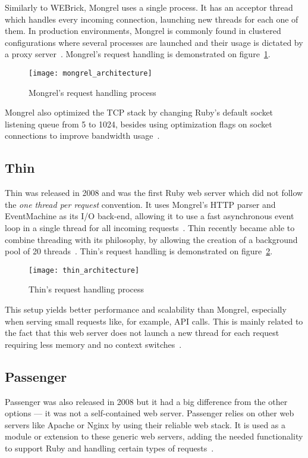 Similarly to WEBrick, Mongrel uses a single process. It has an acceptor thread which handles every incoming connection, launching new threads for each one of them. In production environments, Mongrel is commonly found in clustered configurations where several processes are launched and their usage is dictated by a proxy server~\cite{mongrel_faq}. Mongrel's request handling is demonstrated on figure~\ref{fig:mongrel_architecture}.
\begin{figure}[h]
  \centering
    \texttt{[image: mongrel\_architecture]}
  \caption{Mongrel's request handling process}
  \label{fig:mongrel_architecture}
\end{figure}
Mongrel also optimized the TCP stack by changing Ruby's default socket listening queue from 5 to 1024, besides using optimization flags on socket connections to improve bandwidth usage~\cite{mongrel_faq}.


\subsection{Thin}
Thin was released in 2008 and was the first Ruby web server which did not follow the \textit{one thread per request} convention. It uses Mongrel's HTTP parser and EventMachine as its I/O back-end, allowing it to use a fast asynchronous event loop in a single thread for all incoming requests~\cite{thin}. Thin recently became able to combine threading with its philosophy, by allowing the creation of a background pool of 20 threads~\cite{ruby_webservers}. Thin's request handling is demonstrated on figure~\ref{fig:thin_architecture}.
\begin{figure}[h]
  \centering
    \texttt{[image: thin\_architecture]}
  \caption{Thin's request handling process}
  \label{fig:thin_architecture}
\end{figure}
 This setup yields better performance and scalability than Mongrel, especially when serving small requests like, for example, API calls. This is mainly related to the fact that this web server does not launch a new thread for each request requiring less memory and no context switches~\cite{ruby_webservers}.


\subsection{Passenger}
Passenger was also released in 2008 but it had a big difference from the other options --- it was not a self-contained web server. Passenger relies on other web servers like Apache or Nginx by using their reliable web stack. It is used as a module or extension to these generic web servers, adding the needed functionality to support Ruby and handling certain types of requests~\cite{passenger_whatis}.

